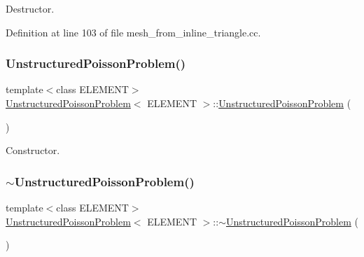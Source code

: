Destructor. 



Definition at line 103 of file mesh\+\_\+from\+\_\+inline\+\_\+triangle.\+cc.

\mbox{\label{classUnstructuredPoissonProblem_a26e7610a714aea17c9278beec4842371}} 
\subsubsection{\texorpdfstring{Unstructured\+Poisson\+Problem()}{UnstructuredPoissonProblem()}\hspace{0.1cm}{\footnotesize\ttfamily [2/2]}}
{\footnotesize\ttfamily template$<$class E\+L\+E\+M\+E\+NT$>$ \\
\hyperlink{classUnstructuredPoissonProblem}{Unstructured\+Poisson\+Problem}$<$ E\+L\+E\+M\+E\+NT $>$\+::\hyperlink{classUnstructuredPoissonProblem}{Unstructured\+Poisson\+Problem} (\begin{DoxyParamCaption}{ }\end{DoxyParamCaption})}



Constructor. 

\mbox{\label{classUnstructuredPoissonProblem_aeae85592e36ba7be6b4891fb49d2197b}} 
\subsubsection{\texorpdfstring{$\sim$\+Unstructured\+Poisson\+Problem()}{~UnstructuredPoissonProblem()}\hspace{0.1cm}{\footnotesize\ttfamily [2/2]}}
{\footnotesize\ttfamily template$<$class E\+L\+E\+M\+E\+NT$>$ \\
\hyperlink{classUnstructuredPoissonProblem}{Unstructured\+Poisson\+Problem}$<$ E\+L\+E\+M\+E\+NT $>$\+::$\sim$\hyperlink{classUnstructuredPoissonProblem}{Unstructured\+Poisson\+Problem} (\begin{DoxyParamCaption}{ }\end{DoxyParamCaption})\hspace{0.3cm}{\ttfamily [inline]}}



